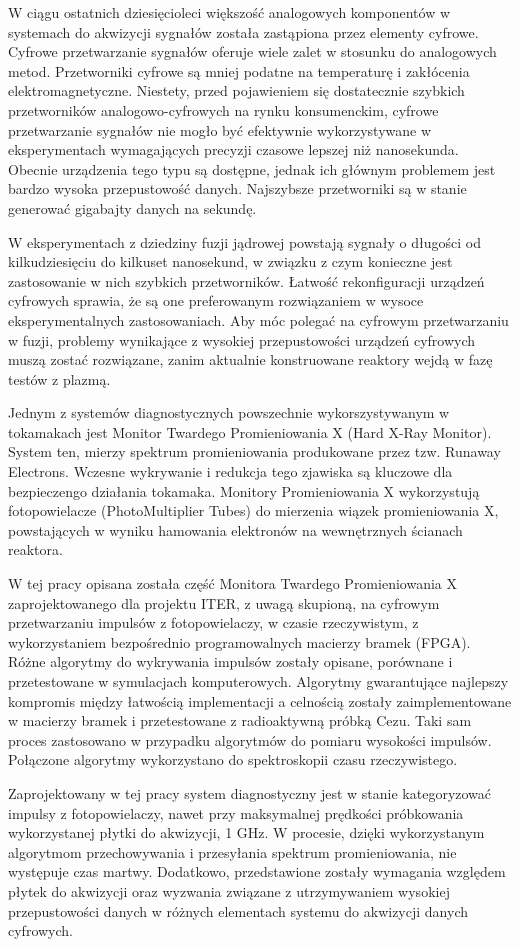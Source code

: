 W ciągu ostatnich dziesięcioleci większość analogowych komponentów
w systemach do akwizycji sygnałów została zastąpiona przez 
elementy cyfrowe. Cyfrowe przetwarzanie sygnałów oferuje
wiele zalet w stosunku do analogowych metod.
Przetworniki cyfrowe są mniej podatne na temperaturę i 
zakłócenia elektromagnetyczne.
Niestety, przed pojawieniem się dostatecznie szybkich przetworników analogowo-cyfrowych
na rynku konsumenckim, cyfrowe przetwarzanie sygnałów nie mogło być 
efektywnie wykorzystywane w eksperymentach wymagających precyzji czasowe
lepszej niż nanosekunda. 
Obecnie urządzenia tego typu są dostępne, jednak ich głównym problemem  
jest bardzo wysoka przepustowość danych. Najszybsze przetworniki
są w stanie generować gigabajty danych na sekundę.


W eksperymentach z dziedziny fuzji jądrowej powstają sygnały
o długości od kilkudziesięciu do kilkuset nanosekund, w związku
z czym konieczne jest zastosowanie w nich szybkich przetworników.
Łatwość rekonfiguracji urządzeń cyfrowych sprawia,
że są one preferowanym rozwiązaniem w wysoce eksperymentalnych
zastosowaniach. Aby móc polegać na cyfrowym przetwarzaniu
w fuzji, problemy wynikające z wysokiej przepustowości 
urządzeń cyfrowych muszą zostać rozwiązane, zanim aktualnie konstruowane
reaktory wejdą w fazę testów z plazmą.


Jednym z systemów diagnostycznych powszechnie wykorszystywanym w 
tokamakach jest Monitor Twardego Promieniowania X (Hard X-Ray Monitor).
System ten, mierzy spektrum promieniowania produkowane przez tzw. Runaway
Electrons. Wczesne wykrywanie i redukcja tego zjawiska są kluczowe
dla bezpieczengo działania tokamaka.
Monitory Promieniowania X wykorzystują fotopowielacze (PhotoMultiplier Tubes)
do mierzenia wiązek promieniowania X, powstających w wyniku hamowania
elektronów na wewnętrznych ścianach reaktora.


W tej pracy opisana została część Monitora Twardego Promieniowania X 
zaprojektowanego dla projektu ITER, z uwagą skupioną, na cyfrowym przetwarzaniu
impulsów z fotopowielaczy, w czasie rzeczywistym, z wykorzystaniem bezpośrednio
programowalnych macierzy bramek (FPGA). Różne algorytmy do wykrywania 
impulsów zostały opisane, porównane i przetestowane w symulacjach komputerowych.
Algorytmy gwarantujące najlepszy kompromis między łatwością implementacji 
a celnością zostały zaimplementowane w macierzy bramek i przetestowane 
z radioaktywną próbką Cezu. Taki sam proces zastosowano w przypadku
algorytmów do pomiaru wysokości impulsów. Połączone algorytmy wykorzystano
do spektroskopii czasu rzeczywistego.


Zaprojektowany w tej pracy system diagnostyczny jest w stanie kategoryzować 
impulsy z fotopowielaczy, nawet przy maksymalnej prędkości próbkowania 
wykorzystanej płytki do akwizycji, 1 GHz. W procesie,
dzięki wykorzystanym algorytmom przechowywania i
przesyłania spektrum promieniowania, nie występuje czas martwy.
Dodatkowo, przedstawione zostały wymagania względem płytek do akwizycji oraz wyzwania
związane z utrzymywaniem wysokiej przepustowości danych w różnych elementach systemu
do akwizycji danych cyfrowych.

